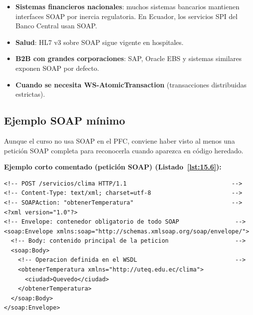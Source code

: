 \documentclass[11pt,a4paper,openany]{book}
\begin{document}
\begin{itemize}
\item \textbf{Sistemas financieros nacionales}: muchos sistemas
bancarios mantienen interfaces SOAP por inercia regulatoria. En
Ecuador, los servicios SPI del Banco Central usan SOAP.
\item \textbf{Salud}: HL7 v3 sobre SOAP sigue vigente en hospitales.
\item \textbf{B2B con grandes corporaciones}: SAP, Oracle EBS y
sistemas similares exponen SOAP por defecto.
\item \textbf{Cuando se necesita WS-AtomicTransaction} (transacciones
distribuidas estrictas).
\end{itemize}

\subsection{Ejemplo SOAP mínimo}

Aunque el curso no usa SOAP en el PFC, conviene haber visto
al menos una petición SOAP completa para reconocerla cuando aparezca
en código heredado.

\textbf{Ejemplo corto comentado (petición SOAP) (Listado~\ref{lst:15.6}):}
\begin{lstlisting}[language=HTML5,numbers=none,caption={Ejemplo de HTML},label=lst:15.6]
<!-- POST /servicios/clima HTTP/1.1                              -->
<!-- Content-Type: text/xml; charset=utf-8                       -->
<!-- SOAPAction: "obtenerTemperatura"                            -->
<?xml version="1.0"?>
<!-- Envelope: contenedor obligatorio de todo SOAP                -->
<soap:Envelope xmlns:soap="http://schemas.xmlsoap.org/soap/envelope/">
  <!-- Body: contenido principal de la peticion                   -->
  <soap:Body>
    <!-- Operacion definida en el WSDL                            -->
    <obtenerTemperatura xmlns="http://uteq.edu.ec/clima">
      <ciudad>Quevedo</ciudad>
    </obtenerTemperatura>
  </soap:Body>
</soap:Envelope>
\end{lstlisting}
\end{document}
